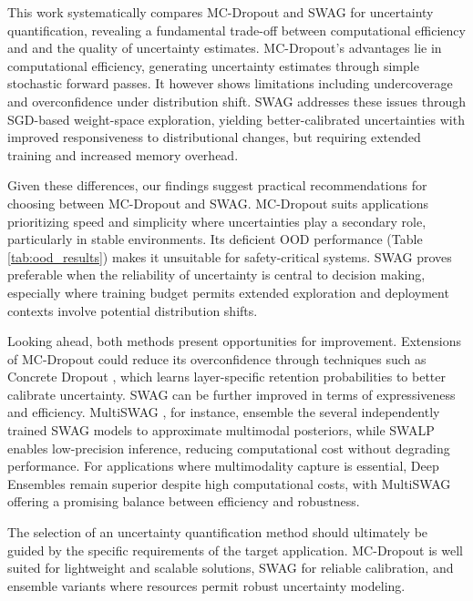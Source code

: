 
This work systematically compares MC-Dropout and SWAG for uncertainty quantification, revealing a
fundamental trade-off between computational efficiency and and the quality of uncertainty estimates.
MC-Dropout's advantages lie in computational efficiency, generating uncertainty estimates through simple
stochastic forward passes. It however shows limitations including undercoverage and overconfidence under
distribution shift. SWAG addresses these issues through SGD-based weight-space exploration, yielding
better-calibrated uncertainties with improved responsiveness to distributional changes, but requiring
extended training and increased memory overhead.

\vspace{0.15cm}
Given these differences, our findings suggest practical recommendations for choosing between MC-Dropout and
SWAG. MC-Dropout suits applications prioritizing speed and simplicity where uncertainties play a secondary
role, particularly in stable environments. Its deficient OOD performance (Table \ref{tab:ood_results})
makes it unsuitable for safety-critical systems. SWAG proves preferable when the reliability of uncertainty
is central to decision making, especially where training budget permits extended exploration and deployment
contexts involve potential distribution shifts.

\vspace{0.15cm}
Looking ahead, both methods present opportunities for improvement. Extensions of MC-Dropout could reduce
its overconfidence through techniques such as Concrete Dropout \citep{gal2017concretedropout}, which learns
layer-specific retention probabilities to better calibrate uncertainty. SWAG can be further improved in
terms of expressiveness and efficiency. MultiSWAG \citep{onal2024multiswag}, for instance, ensemble the
several independently trained SWAG models to approximate multimodal posteriors, while SWALP
\citep{yang2019swalp} enables low-precision inference, reducing computational cost without degrading
performance. For applications where multimodality capture is essential, Deep Ensembles
\citep{lakshminarayanan2017preduncw/deepensembles} remain superior despite high computational costs,
with MultiSWAG offering a promising balance between efficiency and robustness.

\vspace{0.15cm}
The selection of an uncertainty quantification method should ultimately be guided by the specific
requirements of the target application. MC-Dropout is well suited for lightweight and scalable solutions,
SWAG for reliable calibration, and ensemble variants where resources permit robust uncertainty modeling.
